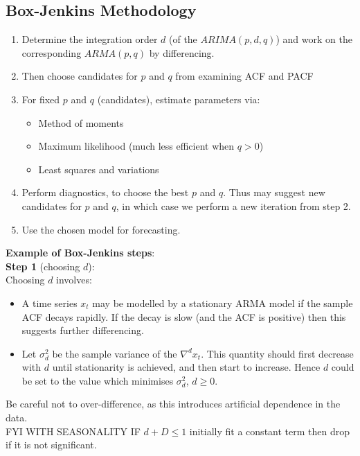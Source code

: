 \documentclass[11pt]{article}
\newcommand{\noi}{\noindent}
\begin{document}
\subsection{Box-Jenkins Methodology}
\begin{enumerate}
    \item Determine the integration order $d$ (of the $ARIMA(p, d, q)$) and work on the corresponding $ARMA(p, q)$ by differencing.
    \item Then choose candidates for $p$ and $q$ from examining ACF and PACF
    \item For fixed $p$ and $q$ (candidates), estimate parameters via:
        \begin{itemize}
            \item Method of moments
            \item Maximum likelihood (much less efficient when $q > 0$)
            \item Least squares and variations
        \end{itemize}
    \item Perform diagnostics, to choose the best $p$ and $q$. Thus may suggest new candidates for $p$ and $q$, in which case we perform a new iteration from step 2.
    \item Use the chosen model for forecasting.
\end{enumerate} \phantom{i}

\noi \textbf{Example of Box-Jenkins steps}: \\

\noi \textbf{Step 1} (choosing $d$): \\
\noi Choosing $d$ involves:
\begin{itemize}
    \item A time series $x_t$ may be modelled by a stationary ARMA model if the sample ACF decays rapidly. If the decay is slow (and the ACF is positive) then this suggests further differencing.
    \item Let $\sigma_d^2$ be the sample variance of the $\nabla^d x_t$. This quantity should first decrease with $d$ until stationarity is achieved, and then start to increase. Hence $d$ could be set to the value which minimises $\sigma_d^2$, $d \geq 0$.
\end{itemize}
\noi Be careful not to over-difference, as this introduces artificial dependence in the data. \\

\noi FYI WITH SEASONALITY IF $d + D \leq 1$ initially fit a constant term then drop if it is not significant. \\
\end{document}
